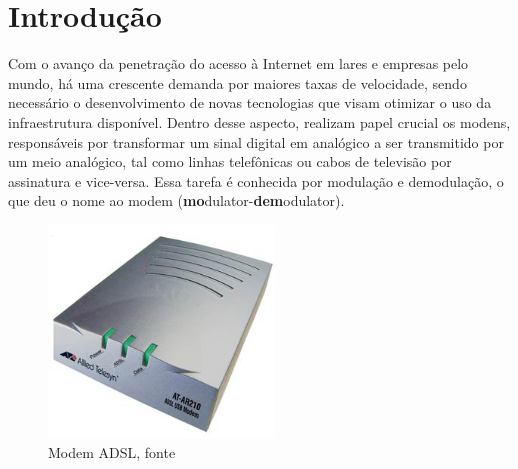 \documentclass[brazil,times,12pt]{abnt}
\begin{document}





\data{\today}

\capa

\folhaderosto

\section*{Introdução}
Com o avanço da penetração do acesso à Internet em lares e empresas pelo mundo,
há uma crescente demanda por maiores taxas de velocidade, sendo necessário o
desenvolvimento de novas tecnologias que visam otimizar o uso da infraestrutura
disponível. Dentro desse aspecto, realizam papel crucial os modens, responsáveis
por transformar um sinal digital em analógico a ser transmitido por um meio
analógico, tal como linhas telefônicas ou cabos de televisão por assinatura e
vice-versa. Essa tarefa é conhecida por modulação e demodulação, o que deu o
nome ao modem (\textbf{mo}dulator-\textbf{dem}odulator).\cite{enwiki:modem}

\begin{figure}[htp]
\begin{center}
  \includegraphics[width=60mm]{imagens/dsl-modem.jpg}
  \caption[Modem ADSL, fonte \cite{hsw:dsl}]{Modem ADSL, fonte \cite{hsw:dsl}}
  \label{modem-adsl}
\end{center}
\end{figure}
\end{document}
